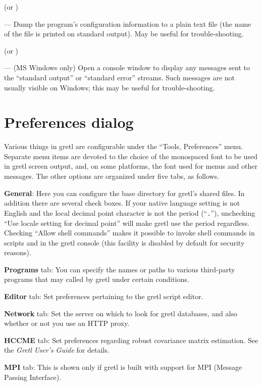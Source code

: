  (or )
      
--- Dump the program's configuration information to a plain text file
(the name of the file is printed on standard output).  May be useful
for trouble-shooting.
      
 (or )

--- (MS Windows only) Open a console window to display any messages
sent to the ``standard output'' or ``standard error'' streams.  Such
messages are not usually visible on Windows; this may be useful for
trouble-shooting.
      
\section{Preferences dialog}
\label{guiprefs}

Various things in gretl are configurable under the ``Tools,
Preferences'' menu.  Separate menu items are devoted to the choice of
the monospaced font to be used in gretl screen output, and, on
some platforms, the font used for menus and other messages.  The other
options are organized under five tabs, as follows.
      
\textbf{General}: Here you can configure the base directory for
gretl's shared files. In addition there are several check
boxes. If your native language setting is not English and the local
decimal point character is not the period (``\texttt{.}''), unchecking
``Use locale setting for decimal point'' will make gretl use the
period regardless.  Checking ``Allow shell commands'' makes it
possible to invoke shell commands in scripts and in the gretl
console (this facility is disabled by default for security reasons).
      
\textbf{Programs} tab: You can specify the names or paths to various
third-party programs that may called by gretl under certain
conditions.

\textbf{Editor} tab: Set preferences pertaining to the gretl
script editor.

\textbf{Network} tab: Set the server on which to look for gretl
databases, and also whether or not you use an HTTP proxy.
      
\textbf{HCCME} tab: Set preferences regarding robust covariance matrix
estimation.  See the \emph{Gretl User's Guide} for details.
      
\textbf{MPI} tab: This is shown only if gretl is built with support
for MPI (Message Passing Interface).
      
